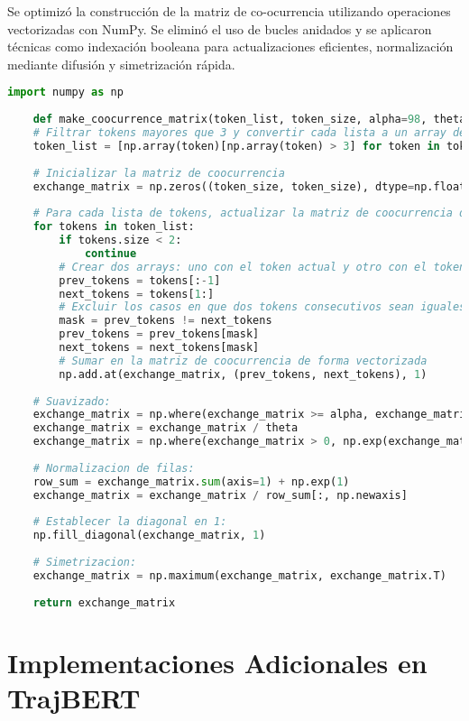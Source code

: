 Se optimizó la construcción de la matriz de co-ocurrencia utilizando operaciones vectorizadas con NumPy. Se eliminó el uso de bucles anidados y se aplicaron técnicas como indexación booleana para actualizaciones eficientes, normalización mediante difusión y simetrización rápida.

\begin{lstlisting}[language=Python, caption={Método optimizado para la construcción de la matriz de co-ocurrencia utilizando operaciones vectorizadas con NumPy.}]
    import numpy as np
    
    def make_coocurrence_matrix(token_list, token_size, alpha=98, theta=1000):
    # Filtrar tokens mayores que 3 y convertir cada lista a un array de NumPy
    token_list = [np.array(token)[np.array(token) > 3] for token in token_list]
    
    # Inicializar la matriz de coocurrencia
    exchange_matrix = np.zeros((token_size, token_size), dtype=np.float32)
    
    # Para cada lista de tokens, actualizar la matriz de coocurrencia de forma vectorizada
    for tokens in token_list:
        if tokens.size < 2:
            continue
        # Crear dos arrays: uno con el token actual y otro con el token siguiente
        prev_tokens = tokens[:-1]
        next_tokens = tokens[1:]
        # Excluir los casos en que dos tokens consecutivos sean iguales
        mask = prev_tokens != next_tokens
        prev_tokens = prev_tokens[mask]
        next_tokens = next_tokens[mask]
        # Sumar en la matriz de coocurrencia de forma vectorizada
        np.add.at(exchange_matrix, (prev_tokens, next_tokens), 1)
    
    # Suavizado:
    exchange_matrix = np.where(exchange_matrix >= alpha, exchange_matrix, 0)
    exchange_matrix = exchange_matrix / theta
    exchange_matrix = np.where(exchange_matrix > 0, np.exp(exchange_matrix), 0)
    
    # Normalizacion de filas:
    row_sum = exchange_matrix.sum(axis=1) + np.exp(1)
    exchange_matrix = exchange_matrix / row_sum[:, np.newaxis]
    
    # Establecer la diagonal en 1:
    np.fill_diagonal(exchange_matrix, 1)
    
    # Simetrizacion:
    exchange_matrix = np.maximum(exchange_matrix, exchange_matrix.T)
    
    return exchange_matrix
\end{lstlisting}


\section{Implementaciones Adicionales en TrajBERT}

